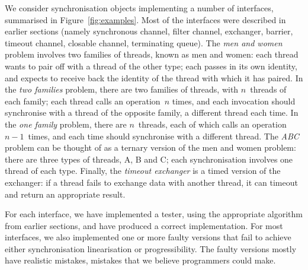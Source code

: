 We consider synchronisation objects implementing a number of interfaces,
summarised in Figure~\ref{fig:examples}.  Most of the interfaces were
described in earlier sections (namely synchronous channel, filter channel,
exchanger, barrier, timeout channel, closable channel, terminating queue).
The \emph{men and women} problem involves two families of threads, known as
men and women: each thread wants to pair off with a thread of the other type;
each passes in its own identity, and expects to receive back the identity of
the thread with which it has paired.  In the \emph{two families} problem,
there are two families of threads, with $n$~threads of each family; each
thread calls an operation~$n$ times, and each invocation should synchronise
with a thread of the opposite family, a different thread each time.  In the
\emph{one family} problem, there are $n$~threads, each of which calls an
operation $n-1$~times, and each time should synchronise with a different
thread.  The \emph{ABC} problem can be thought of as a ternary version of the
men and women problem: there are three types of threads, A, B and C; each
synchronisation involves one thread of each type.  Finally, the \emph{timeout
  exchanger} is a timed version of the exchanger: if a thread fails to
exchange data with another thread, it can timeout and return an appropriate
result.



For each interface, we have implemented a tester, using the appropriate
algorithm from earlier sections, and have produced a correct implementation.
For most interfaces, we also implemented one or more faulty versions that fail
to achieve either synchronisation linearisation or progressibility.  The
faulty versions mostly have realistic mistakes, mistakes that we believe
programmers could make.

